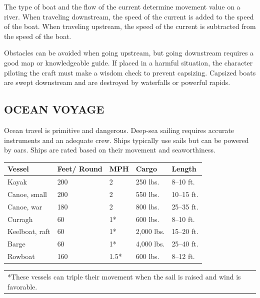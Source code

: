 \begin{multicols}{2}
The type of boat and the flow of the current determine movement value on a river.  When traveling downstream, the speed of the current is added to the speed of the boat.  When traveling upstream, the speed of the current is subtracted from the speed of the boat.  

Obstacles can be avoided when going upstream, but going downstream requires a good map or knowledgeable guide.  If placed in a harmful situation, the character piloting the craft must make a wisdom check to prevent capsizing.  Capsized boats are swept downstream and are destroyed by waterfalls or powerful rapids.

\subsection{OCEAN VOYAGE}

Ocean travel is primitive and dangerous.  Deep-sea sailing requires accurate instruments and an adequate crew.  Ships typically use sails but can be powered by oars.  Ships are rated based on their movement and seaworthiness.

\noindent
\begin{minipage}{\columnwidth}

\label{boatmovement}
\noindent
\begin{tabular}{|p{}|p{}|p{}|p{}|p{}|}
\hline
Vessel	& Feet/ Round	& MPH	& Cargo	& Length \\
\hline\hline
\rowcolor[gray]{.9}Kayak			& 200	& 2		& 250 lbs.		& 8--10 ft. \\
Canoe, small	& 200	& 2		& 550 lbs.		& 10--15 ft. \\
\rowcolor[gray]{.9}Canoe, war		& 180	& 2		& 800 lbs.		& 25--35 ft. \\
Curragh			& 60	& 1*	& 600 lbs.		& 8--10 ft. \\
\rowcolor[gray]{.9}Keelboat, raft	& 60	& 1*	& 2,000 lbs.	& 15--20 ft. \\
Barge			& 60	& 1*	& 4,000 lbs.	& 25--40 ft. \\
\rowcolor[gray]{.9}Rowboat			& 160	& 1.5*	& 600 lbs.		& 8--12 ft. \\
\hline
\end{tabular}
\noindent\begin{tabular}{p{}}
*These vessels can triple their movement when the sail is raised and wind is favorable. \\
\end{tabular}\vspace{.5em}


\end{minipage}
\end{multicols}
